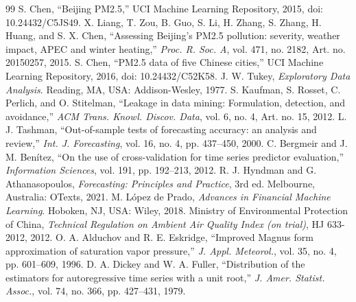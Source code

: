 \documentclass[conference]{IEEEtran}
\begin{document}
\begin{thebibliography}{99}
 S. Chen, ``Beijing PM2.5,'' UCI Machine Learning Repository, 2015, doi: 10.24432/C5JS49.
 X. Liang, T. Zou, B. Guo, S. Li, H. Zhang, S. Zhang, H. Huang, and S. X. Chen, ``Assessing Beijing's PM2.5 pollution: severity, weather impact, APEC and winter heating,'' \emph{Proc. R. Soc. A}, vol. 471, no. 2182, Art. no. 20150257, 2015.
 S. Chen, ``PM2.5 data of five Chinese cities,'' UCI Machine Learning Repository, 2016, doi: 10.24432/C52K58.
 J. W. Tukey, \emph{Exploratory Data Analysis}. Reading, MA, USA: Addison-Wesley, 1977.
 S. Kaufman, S. Rosset, C. Perlich, and O. Stitelman, ``Leakage in data mining: Formulation, detection, and avoidance,'' \emph{ACM Trans. Knowl. Discov. Data}, vol. 6, no. 4, Art. no. 15, 2012.
 L. J. Tashman, ``Out-of-sample tests of forecasting accuracy: an analysis and review,'' \emph{Int. J. Forecasting}, vol. 16, no. 4, pp. 437--450, 2000.
 C. Bergmeir and J. M. Ben\'{i}tez, ``On the use of cross-validation for time series predictor evaluation,'' \emph{Information Sciences}, vol. 191, pp. 192--213, 2012.
 R. J. Hyndman and G. Athanasopoulos, \emph{Forecasting: Principles and Practice}, 3rd ed. Melbourne, Australia: OTexts, 2021.
 M. L\'{o}pez de Prado, \emph{Advances in Financial Machine Learning}. Hoboken, NJ, USA: Wiley, 2018.
 Ministry of Environmental Protection of China, \emph{Technical Regulation on Ambient Air Quality Index (on trial)}, HJ 633-2012, 2012.
 O. A. Alduchov and R. E. Eskridge, ``Improved Magnus form approximation of saturation vapor pressure,'' \emph{J. Appl. Meteorol.}, vol. 35, no. 4, pp. 601--609, 1996.
 D. A. Dickey and W. A. Fuller, ``Distribution of the estimators for autoregressive time series with a unit root,'' \emph{J. Amer. Statist. Assoc.}, vol. 74, no. 366, pp. 427--431, 1979.
\end{thebibliography}
\end{document}
